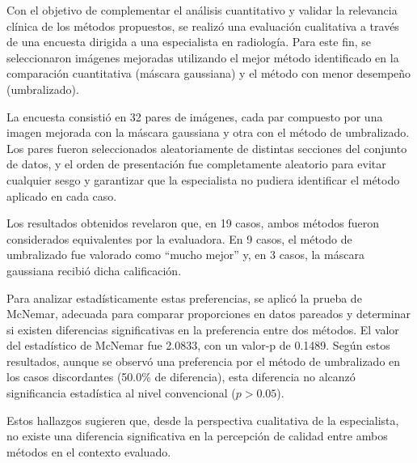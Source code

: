 Con el objetivo de complementar el análisis cuantitativo y validar la relevancia clínica de los métodos propuestos, se realizó una evaluación cualitativa a través de una encuesta dirigida a una especialista en radiología. Para este fin, se seleccionaron imágenes mejoradas utilizando el mejor método identificado en la comparación cuantitativa (máscara gaussiana) y el método con menor desempeño (umbralizado).

La encuesta consistió en 32 pares de imágenes, cada par compuesto por una imagen mejorada con la máscara gaussiana y otra con el método de umbralizado. Los pares fueron seleccionados aleatoriamente de distintas secciones del conjunto de datos, y el orden de presentación fue completamente aleatorio para evitar cualquier sesgo y garantizar que la especialista no pudiera identificar el método aplicado en cada caso.

Los resultados obtenidos revelaron que, en 19 casos, ambos métodos fueron considerados equivalentes por la evaluadora. En 9 casos, el método de umbralizado fue valorado como “mucho mejor” y, en 3 casos, la máscara gaussiana recibió dicha calificación.

Para analizar estadísticamente estas preferencias, se aplicó la prueba de McNemar, adecuada para comparar proporciones en datos pareados y determinar si existen diferencias significativas en la preferencia entre dos métodos\cite{mcnemar}. El valor del estadístico de McNemar fue 2.0833, con un valor-p de 0.1489. Según estos resultados, aunque se observó una preferencia por el método de umbralizado en los casos discordantes (50.0\% de diferencia), esta diferencia no alcanzó significancia estadística al nivel convencional ($p > 0.05$).

Estos hallazgos sugieren que, desde la perspectiva cualitativa de la especialista, no existe una diferencia significativa en la percepción de calidad entre ambos métodos en el contexto evaluado.